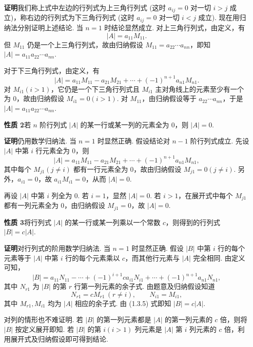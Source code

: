 \documentclass[UTF8,12pt,a4paper,fontset=fandol]{ctexart}
\begin{document}
\noindent\textbf{证明}\quad 我们称上式中左边的行列式为上三角行列式 (这时 $a_{ij}=0$ 对一切 $i>j$ 成立)，称右边的行列式为下三角行列式 (这时 $a_{ij}=0$ 对一切 $i<j$ 成立).
现在用归纳法分别证明上述结论. 当 $n=1$ 时结论显然成立. 对上三角行列式，由定义，有
\[
|A|=a_{11}M_{11}.
\]
但 $M_{11}$ 仍是一个上三角行列式，故由归纳假设 $M_{11}=a_{22}\cdots a_{nn}$，即知 $|A|=a_{11}a_{22}\cdots a_{nn}$.

对于下三角行列式，由定义，有
\begin{equation}
|A|=a_{11}M_{11}-a_{21}M_{21}+\cdots+(-1)^{n+1}a_{n1}M_{n1}.
\tag{1.3.4}
\end{equation}
对 $M_{i1}(i>1)$，它仍是一个下三角行列式且 $M_{i1}$ 主对角线上的元素至少有一个为 0，故由归纳假设 $M_{i1}=0(i>1)$. 对 $M_{11}$，由归纳假设等于 $a_{22}\cdots a_{nn}$，于是 $|A|=a_{11}a_{22}\cdots a_{nn}$.

\noindent\textbf{性质 2}\quad 若 $n$ 阶行列式 $|A|$ 的某一行或某一列的元素全为 0，则 $|A|=0$.

\noindent\textbf{证明}\quad 仍用数学归纳法. 当 $n=1$ 时显然正确. 假设结论对 $n-1$ 阶行列式成立. 先设 $|A|$ 中第 $i$ 行元素全为 0，则
\[
|A|=a_{11}M_{11}-a_{21}M_{21}+\cdots+(-1)^{n+1}a_{n1}M_{n1},
\]
其中每个 $M_{j1}(j\ne i)$ 都有一行元素全为 0，故由归纳假设 $M_{j1}=0(j\ne i)$. 另外，$a_{i1}=0$，故 $a_{i1}M_{i1}=0$，从而 $|A|=0$.

再设 $|A|$ 中第 $i$ 列全为 0. 若 $i=1$，显然 $|A|=0$. 若 $i>1$，在展开式中每个 $M_{j1}$ 都有一列元素全为 0，由归纳假设 $M_{j1}=0$，故 $|A|=0$.

\noindent\textbf{性质 3}\quad 将行列式 $|A|$ 的某一行或某一列乘以一个常数 $c$，则得到的行列式 $|B|=c|A|$.

\noindent\textbf{证明}\quad 对行列式的阶用数学归纳法. 当 $n=1$ 时显然正确. 假设 $|B|$ 中第 $i$ 行的每个元素等于 $|A|$ 中第 $i$ 行的每个元素乘以 $c$，而其他行元素与 $|A|$ 完全相同. 由定义可知，
\begin{equation}
|B|=a_{11}N_{11}-\cdots+(-1)^{i+1}ca_{i1}N_{i1}+\cdots+(-1)^{n+1}a_{n1}N_{n1},
\tag{1.3.5}
\end{equation}
其中 $N_{r1}$ 为 $|B|$ 的第 $r$ 行第一列元素的余子式. 由题意及归纳假设知道
\[
N_{r1}=cM_{r1}\ (r\ne i),\qquad N_{i1}=M_{i1},
\]
其中 $M_{r1},M_{i1}$ 均为 $|A|$ 相应的余子式. 由 (1.3.5) 式即知 $|B|=c|A|$.

对列的情形也不难证明. 若 $|B|$ 的第一列元素都是 $|A|$ 的第一列元素的 $c$ 倍，则将 $|B|$ 按定义展开即知. 若 $|B|$ 的第 $i(i>1)$ 列元素是 $|A|$ 第 $i$ 列元素的 $c$ 倍，利用展开式及归纳假设即可得到结论.
\end{document}
